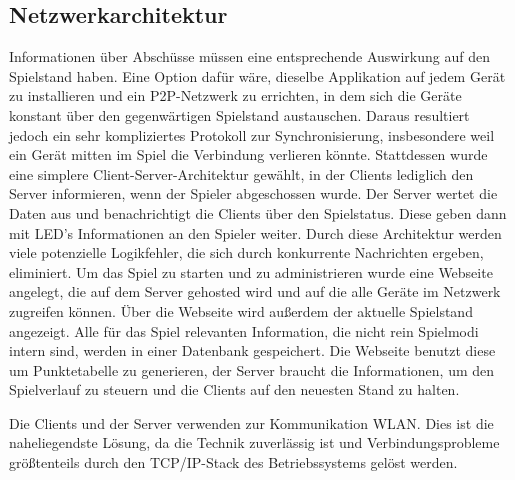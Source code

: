 \subsection{Netzwerkarchitektur}
\label{sec:architektur-netzwerkarchitektur}

Informationen über Abschüsse müssen eine entsprechende Auswirkung auf den Spielstand haben.
Eine Option dafür wäre, dieselbe Applikation auf jedem Gerät zu installieren und ein P2P-Netzwerk zu
errichten, in dem sich die Geräte konstant über den gegenwärtigen Spielstand austauschen.
Daraus resultiert jedoch ein sehr kompliziertes Protokoll zur Synchronisierung, insbesondere weil
ein Gerät mitten im Spiel die Verbindung verlieren könnte.
Stattdessen wurde eine simplere Client-Server-Architektur gewählt, in der Clients lediglich
den Server informieren, wenn der Spieler abgeschossen wurde.
Der Server wertet die Daten aus und benachrichtigt die Clients über den Spielstatus.
Diese geben dann mit LED's Informationen an den Spieler weiter.
Durch diese Architektur werden viele potenzielle Logikfehler, die sich durch konkurrente Nachrichten
ergeben, eliminiert. Um das Spiel zu starten und zu administrieren wurde eine
Webseite angelegt, die auf dem Server gehosted wird und auf die alle Geräte im
Netzwerk zugreifen können. Über die Webseite wird außerdem der aktuelle
Spielstand angezeigt. Alle für das Spiel relevanten Information, die nicht
rein Spielmodi intern sind, werden in einer Datenbank gespeichert. Die Webseite
benutzt diese um Punktetabelle zu generieren, der Server braucht die Informationen,
um den Spielverlauf zu steuern und die Clients auf den neuesten Stand zu halten.

Die Clients und der Server verwenden zur Kommunikation WLAN. Dies ist die naheliegendste Lösung, da
die Technik zuverlässig ist und Verbindungsprobleme größtenteils durch den TCP/IP-Stack des
Betriebssystems gelöst werden.